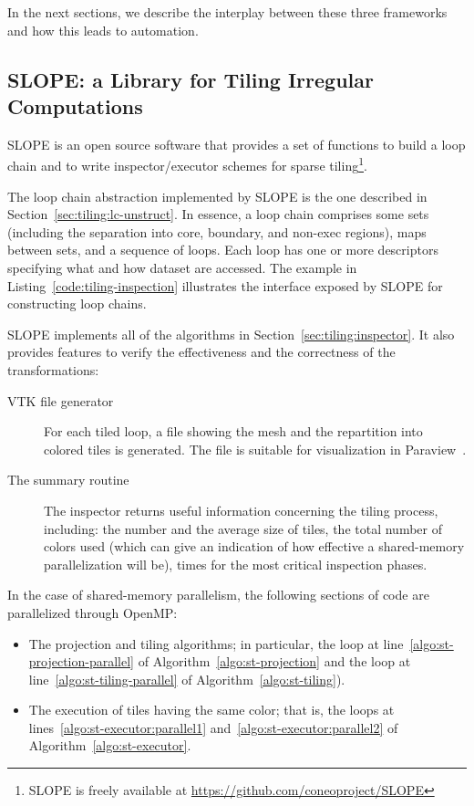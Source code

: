 
In the next sections, we describe the interplay between these three frameworks and how this leads to automation.

\subsection{SLOPE: a Library for Tiling Irregular Computations}
SLOPE is an open source software that provides a set of functions to build a loop chain and to write inspector/executor schemes for sparse tiling\footnote{SLOPE is freely available at \url{https://github.com/coneoproject/SLOPE}}. 

The loop chain abstraction implemented by SLOPE is the one described in Section~\ref{sec:tiling:lc-unstruct}. In essence, a loop chain comprises some sets (including the separation into core, boundary, and non-exec regions), maps between sets, and a sequence of loops. Each loop has one or more descriptors specifying what and how dataset are accessed. The example in Listing~\ref{code:tiling-inspection} illustrates the interface exposed by SLOPE for constructing loop chains. 

SLOPE implements all of the algorithms in Section~\ref{sec:tiling:inspector}. It also provides features to verify the effectiveness and the correctness of the transformations:
\begin{description}
\item[VTK file generator] For each tiled loop, a file showing the mesh and the repartition into colored tiles is generated. The file is suitable for visualization in Paraview~\cite{paraview}.
\item[The summary routine] The inspector returns useful information concerning the tiling process, including: the number and the average size of tiles, the total number of colors used (which can give an indication of how effective a shared-memory parallelization will be), times for the most critical inspection phases. 
\end{description}

In the case of shared-memory parallelism, the following sections of code are parallelized through OpenMP:
\begin{itemize}
\item The projection and tiling algorithms; in particular, the loop at line~\ref{algo:st-projection-parallel} of Algorithm~\ref{algo:st-projection} and the loop at line~\ref{algo:st-tiling-parallel} of Algorithm~\ref{algo:st-tiling}).
\item The execution of tiles having the same color; that is, the loops at lines~\ref{algo:st-executor:parallel1} and~\ref{algo:st-executor:parallel2} of Algorithm~\ref{algo:st-executor}.
\end{itemize}


